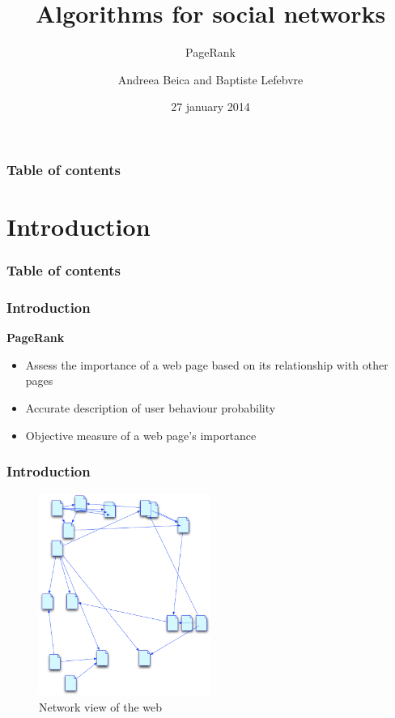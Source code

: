 \documentclass[10pt]{beamer}
\begin{document}
  
  \title{Algorithms for social networks}
  \subtitle{PageRank}
  \author{Andreea Beica and Baptiste Lefebvre}
  \date{27 january 2014}
  \maketitle

  
\begin{frame}
  \frametitle{Table of contents}
  \tableofcontents
\end{frame}



\section{Introduction}

\begin{frame}
  \frametitle{Table of contents}
  \tableofcontents[currentsection]
\end{frame}

\begin{frame}
  \frametitle{Introduction}
  \textbf{PageRank} 
  \begin{itemize}
    \item Assess the importance of a web page based on its relationship with other pages
    \item Accurate description of user behaviour probability
    \item Objective measure of a web page's importance
  \end{itemize}
\end{frame}

\begin{frame}
  \frametitle{Introduction}
  \begin{figure}[h]
    \includegraphics[width=0.5\textwidth]{webgraph.png}
    \caption{Network view of the web}
  \end{figure}
\end{frame}
\end{document}
